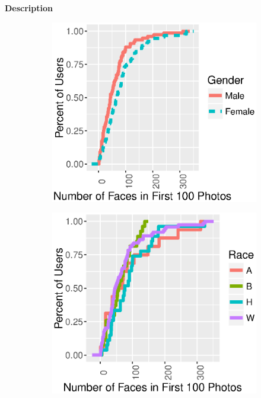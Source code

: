 \textbf{Description}


\begin{figure}[t]
  \centering
  \begin{subfigure}[b]{.21\textwidth}
    \centering
    \includegraphics[width=\linewidth]{fig/census/face_cdf_gender.eps}
    \caption{}
    \label{fig:face_cdf_gender}
  \end{subfigure}
  \begin{subfigure}[b]{.21\textwidth}
    \centering
    \includegraphics[width=\linewidth]{fig/census/face_cdf_race.eps}
    \caption{}
    \label{fig:face_cdf_race}
  \end{subfigure}
  \caption{}
  \label{fig:face_cdf}
\end{figure}

